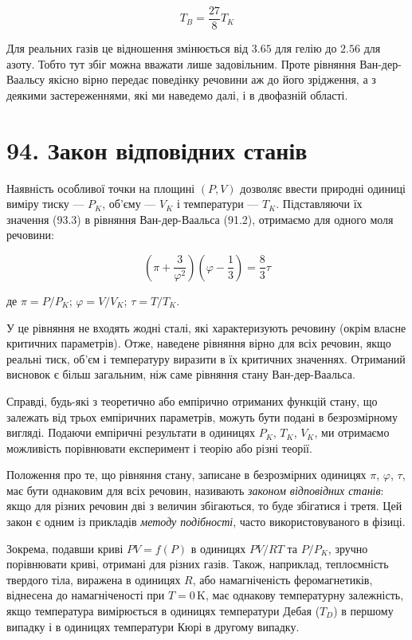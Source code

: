 \documentclass{article}
\begin{document}
\begin{equation}
T_{B} = \frac{27}{8}T_{K}
\label{eq:93.10}
\end{equation}

Для реальних газів це відношення змінюється від $3.65$ для гелію до $2.56$ для азоту. Тобто тут збіг
можна
вважати лише задовільним. Проте рівняння Ван-дер-Ваальсу якісно вірно передає поведінку речовини аж до
його зрідження, а з деякими застереженнями, які ми наведемо далі, і в двофазній області.


\section*{94. Закон відповідних станів}

Наявність особливої точки на площині $(P, V)$ дозволяє ввести природні одиниці виміру тиску — $P_{K}$,
об'єму — $V_{K}$ і температури — $T_{K}$. Підставляючи їх значення (93.3) в рівняння Ван-дер-Ваальса
(91.2), отримаємо для одного моля речовини:

\begin{equation}
\left( \pi + \frac{3}{\varphi^{2}} \right)\left( \varphi - \frac{1}{3} \right) = \frac{8}{3}\tau
\label{eq:94.1}
\end{equation}

де $\pi = P / P_{K}$; $\varphi = V / V_{K}$; $\tau = T / T_{K}$.

У це рівняння не входять жодні сталі, які характеризують речовину (окрім власне критичних параметрів).
Отже, наведене рівняння вірно для всіх речовин, якщо реальні тиск, об'єм і температуру виразити в їх
критичних значеннях. Отриманий висновок є більш загальним, ніж саме рівняння стану Ван-дер-Ваальса.

Справді, будь-які з теоретично або емпірично отриманих функцій стану, що залежать від трьох емпіричних
параметрів, можуть бути подані в безрозмірному вигляді. Подаючи емпіричні результати в одиницях
$P_{K}$, $T_{K}$, $V_{K}$, ми отримаємо можливість порівнювати експеримент і теорію або різні теорії.

Положення про те, що рівняння стану, записане в безрозмірних одиницях $\pi$, $\varphi$, $\tau$, має
бути однаковим для всіх речовин, називають \emph{законом відповідних станів}: якщо для різних речовин
дві з величин збігаються, то буде збігатися і третя. Цей закон є одним із прикладів \emph{методу
подібності}, часто використовуваного в фізиці.

Зокрема, подавши криві $PV = f(P)$ в одиницях $PV/RT$ та $P/P_{K}$, зручно порівнювати криві, отримані
для різних газів. Також, наприклад, теплоємність твердого тіла, виражена в одиницях $R$, або
намагніченість феромагнетиків, віднесена до намагніченості при $T = 0\,\text{K}$, має однакову
температурну залежність, якщо температура вимірюється в одиницях температури Дебая ($T_{D}$) в першому
випадку і в одиницях температури Кюрі в другому випадку.
\end{document}
